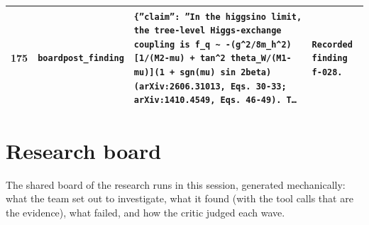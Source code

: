 \documentclass[11pt,a4paper]{article}
\begin{document}
\begin{longtable}{@{}p{}p{}p{}p{}@{}}
175 & \texttt{board}\newline\texttt{post\_\allowbreak{}finding} & \texttt{\{''claim'':\allowbreak{} ''In the higgsino limit,\allowbreak{} the tree-level Higgs-exchange coupling is f\_\allowbreak{}q \textasciitilde{}\allowbreak{} -(g\textasciicircum{}\allowbreak{}2/\allowbreak{}8m\_\allowbreak{}h\textasciicircum{}\allowbreak{}2)\allowbreak{}[1/\allowbreak{}(M2-\textbar{}\allowbreak{}mu\textbar{}\allowbreak{})\allowbreak{} + tan\textasciicircum{}\allowbreak{}2 theta\_\allowbreak{}W/\allowbreak{}(M1-\textbar{}\allowbreak{}mu\textbar{}\allowbreak{})\allowbreak{}]\allowbreak{}(1 + sgn(mu)\allowbreak{} sin 2beta)\allowbreak{} (arXiv:\allowbreak{}2606.31013,\allowbreak{} Eqs. 30-33;\allowbreak{} arXiv:\allowbreak{}1410.4549,\allowbreak{} Eqs. 46-49)\allowbreak{}. T\ldots{}\allowbreak{}} & \texttt{Recorded finding f-028.} \\
\bottomrule\end{longtable}

\section{Research board}
\label{app:board}
The shared board of the research runs in this session, generated mechanically: what the team set out to investigate, what it found (with the tool calls that are the evidence), what failed, and how the critic judged each wave.
\end{document}
